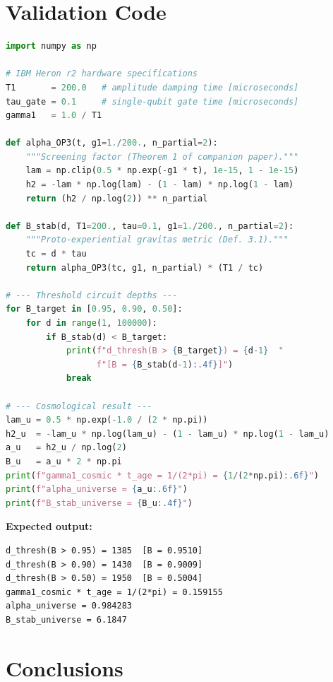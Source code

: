 \documentclass[12pt,letterpaper]{article}
\theoremstyle{definition}
\theoremstyle{remark}
\newcommand{\Bstab}{B_{\rm stab}}
\begin{document}
\section{Validation Code}
\label{sec:code}

\begin{lstlisting}[language=Python, caption={Validation code for $\Bstab$ metrics.
  Requires only \texttt{numpy}.}, label={lst:bstab}]
import numpy as np

# IBM Heron r2 hardware specifications
T1       = 200.0   # amplitude damping time [microseconds]
tau_gate = 0.1     # single-qubit gate time [microseconds]
gamma1   = 1.0 / T1

def alpha_OP3(t, g1=1./200., n_partial=2):
    """Screening factor (Theorem 1 of companion paper)."""
    lam = np.clip(0.5 * np.exp(-g1 * t), 1e-15, 1 - 1e-15)
    h2 = -lam * np.log(lam) - (1 - lam) * np.log(1 - lam)
    return (h2 / np.log(2)) ** n_partial

def B_stab(d, T1=200., tau=0.1, g1=1./200., n_partial=2):
    """Proto-experiential gravitas metric (Def. 3.1)."""
    tc = d * tau
    return alpha_OP3(tc, g1, n_partial) * (T1 / tc)

# --- Threshold circuit depths ---
for B_target in [0.95, 0.90, 0.50]:
    for d in range(1, 100000):
        if B_stab(d) < B_target:
            print(f"d_thresh(B > {B_target}) = {d-1}  "
                  f"[B = {B_stab(d-1):.4f}]")
            break

# --- Cosmological result ---
lam_u = 0.5 * np.exp(-1.0 / (2 * np.pi))
h2_u  = -lam_u * np.log(lam_u) - (1 - lam_u) * np.log(1 - lam_u)
a_u   = h2_u / np.log(2)
B_u   = a_u * 2 * np.pi
print(f"gamma1_cosmic * t_age = 1/(2*pi) = {1/(2*np.pi):.6f}")
print(f"alpha_universe = {a_u:.6f}")
print(f"B_stab_universe = {B_u:.4f}")
\end{lstlisting}

\noindent\textbf{Expected output:}
\begin{verbatim}
d_thresh(B > 0.95) = 1385  [B = 0.9510]
d_thresh(B > 0.90) = 1430  [B = 0.9009]
d_thresh(B > 0.50) = 1950  [B = 0.5004]
gamma1_cosmic * t_age = 1/(2*pi) = 0.159155
alpha_universe = 0.984283
B_stab_universe = 6.1847
\end{verbatim}

\section{Conclusions}
\label{sec:conclusions}
\end{document}
